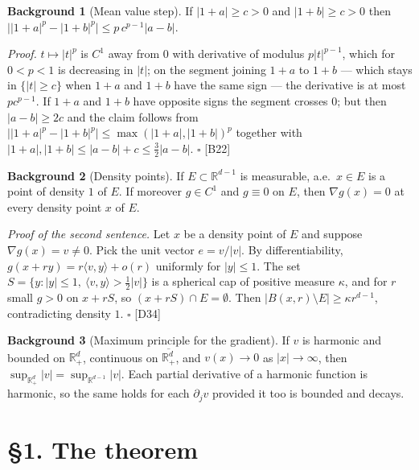 \documentclass[11pt,reqno]{amsart}
\theoremstyle{plain}
\theoremstyle{definition}
\newtheorem*{bg}{Background}
\theoremstyle{plain}
\theoremstyle{definition}
\theoremstyle{remark}
\newcommand{\Rd}{\mathbb{R}^d_+}
\newcommand{\Rdm}{\mathbb{R}^{d-1}}
\newcommand{\Ledger}[1]{{\scriptsize\textsf{[#1]}}}
\begin{document}
\begin{bg}[Mean value step]\label{bg:mvt}
If $|1+a|\ge c>0$ and $|1+b|\ge c>0$ then
$\bigl||1+a|^p-|1+b|^p\bigr|\le p\,c^{p-1}|a-b|$.
\end{bg}

\begin{filled}
\emph{Proof.} $t\mapsto|t|^p$ is $C^1$ away from $0$ with derivative of modulus
$p|t|^{p-1}$, which for $0<p<1$ is decreasing in $|t|$; on the segment joining
$1+a$ to $1+b$ --- which stays in $\{|t|\ge c\}$ when $1+a$ and $1+b$ have the same
sign --- the derivative is at most $pc^{p-1}$. If $1+a$ and $1+b$ have opposite signs
the segment crosses $0$; but then $|a-b|\ge2c$ and the claim follows from
$\bigl||1+a|^p-|1+b|^p\bigr|\le\max(|1+a|,|1+b|)^p$ together with
$|1+a|,|1+b|\le|a-b|+c\le\frac32|a-b|$. \hfill$\square$ \Ledger{B22}
\end{filled}

\begin{bg}[Density points]\label{bg:density}
If $E\subset\Rdm$ is measurable, a.e.\ $x\in E$ is a point of density $1$ of $E$.
If moreover $g\in C^1$ and $g\equiv0$ on $E$, then $\nabla g(x)=0$ at every density
point $x$ of $E$.
\end{bg}

\begin{filled}
\emph{Proof of the second sentence.} Let $x$ be a density point of $E$ and suppose
$\nabla g(x)=v\ne0$. Pick the unit vector $e=v/|v|$. By differentiability,
$g(x+ry)=r\langle v,y\rangle+o(r)$ uniformly for $|y|\le1$. The set
$S=\{y:|y|\le1,\ \langle v,y\rangle>\tfrac12|v|\}$ is a spherical cap of positive
measure $\kappa$, and for $r$ small $g>0$ on $x+rS$, so $(x+rS)\cap E=\emptyset$.
Then $|B(x,r)\setminus E|\ge\kappa r^{d-1}$, contradicting density $1$.
\hfill$\square$ \Ledger{D34}
\end{filled}

\begin{bg}[Maximum principle for the gradient]\label{bg:max}
If $v$ is harmonic and bounded on $\Rd$, continuous on $\overline{\Rd}$, and
$v(x)\to0$ as $|x|\to\infty$, then $\sup_{\Rd}|v|=\sup_{\Rdm}|v|$. Each partial
derivative of a harmonic function is harmonic, so the same holds for each
$\partial_jv$ provided it too is bounded and decays.
\end{bg}

\section*{\S1. The theorem}
\end{document}
